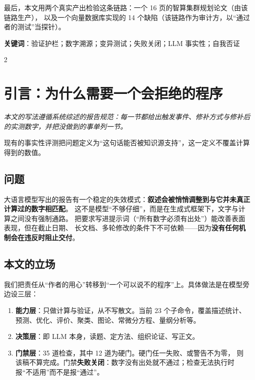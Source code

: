 \documentclass[11pt,a4paper]{article}
\begin{document}
最后，本文用两个真实产出检验这条链路：一个 16 页的智算集群规划论文（由该链路生产），
以及一个向量数据库实现的 14 个缺陷（该链路作为审计方，以“通过者的测试”当探针）。

\textbf{关键词}：验证护栏；数字溯源；变异测试；失败关闭；LLM 事实性；自我否证

\newpage
{\footnotesize
\setlength{\parskip}{0pt}
\makeatletter
\renewcommand{\l@section}{\@dottedtocline{1}{0em}{1.7em}}
\renewcommand{\l@subsection}{\@dottedtocline{2}{1.7em}{2.4em}}
\makeatother
\renewcommand{\contentsname}{目\quad 录}
\begin{multicols}{2}
\tableofcontents
\end{multicols}}
\newpage

\section{引言：为什么需要一个会拒绝的程序}
\noindent\emph{本文的写法遵循系统综述的报告规范\cite{ref17,ref18}：每一节都给出触发事件、修补方式与修补后的实测数字，并把\emph{没做到的事}单列一节。}

现有的事实性评测把问题定义为“这句话能否被知识源支持”\cite{ref13,ref14}，这一定义不覆盖计算得到的数值。

\subsection{问题}
大语言模型写出的报告有一个稳定的失效模式：\textbf{叙述会被悄悄调整到与它并未真正计算过的数字相匹配}。
这不是模型“不够仔细”，而是在生成式框架下，文字与计算之间没有强制通路。
把要求写进提示词（“所有数字必须有出处”）能改善表面表现，但在截止日期、
长文档、多轮修改的条件下不可依赖——因为\textbf{没有任何机制会在违反时阻止交付}。

\subsection{本文的立场}
我们把责任从“作者的用心”转移到“一个可以说不的程序”上。具体做法是在模型旁边设三层：

\begin{enumerate}[leftmargin=1.6em,itemsep=2pt]
\item \textbf{能力层}：只做计算与验证，从不写散文。当前 23 个子命令，覆盖描述统计、
  预测、优化、评价、聚类、图论、常微分方程、量纲分析等。
\item \textbf{决策层}：即 LLM 本身，读题、定方法、组织论证、写正文。
\item \textbf{门禁层}：35 道检查，其中 12 道为硬门。硬门任一失败、或警告不为零，
  则该稿不算完成。门禁\textbf{失败关闭}：数字没有出处就不通过；检查无法执行时
  报“不适用”而不是报“通过”。
\end{enumerate}
\end{document}
